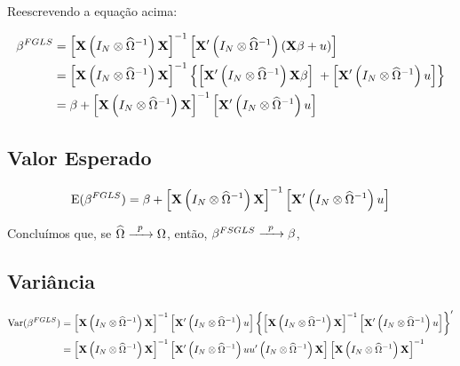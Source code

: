 \documentclass[11pt, oneside, a4paper, article]{article}
\numberwithin{equation}{section}
\begin{document}
Reescrevendo a equação acima:

\vspace{-1.5 em}
\begin{align*}
\beta^{FGLS}
&= 
\left[  \mathbf{X} \left( I_{N} \otimes \widehat{\Omega}^{-1} \right) \mathbf{X} \right]^{-1}
\left[  \mathbf{X}' \left( I_{N} \otimes \widehat{\Omega}^{-1} \right) (\mathbf{X} \beta + u) \right]
\\
&= 
\left[ \mathbf{X} \left( I_{N} \otimes \widehat{\Omega}^{-1} \right) \mathbf{X} \right]^{-1}
\left\{ 
\left[ \mathbf{X}' \left( I_{N} \otimes \widehat{\Omega}^{-1} \right) \mathbf{X} \beta \right]
\; +
\left[ \mathbf{X}' \left( I_{N} \otimes \widehat{\Omega}^{-1} \right) u \right]
\right\}
\\
&= 
\beta +
\left[ \mathbf{X} \left( I_{N} \otimes \widehat{\Omega}^{-1} \right) \mathbf{X} \right]^{-1}
\left[ \mathbf{X}' \left( I_{N} \otimes \widehat{\Omega}^{-1} \right) u \right]
\end{align*}

\subsection*{Valor Esperado}

\vspace{-1 em}
\begin{align*}
\text{E}(\beta^{FGLS})
= 
\beta +
\left[ \mathbf{X} \left( I_{N} \otimes \widehat{\Omega}^{-1} \right) \mathbf{X} \right]^{-1}
\left[ \mathbf{X}' \left( I_{N} \otimes \widehat{\Omega}^{-1} \right) u \right]
\end{align*}

Concluímos que, se 
$\widehat{\Omega} \xrightarrow{\enskip p \enskip} \Omega$,
então,
$\beta^{FSGLS} \xrightarrow{\enskip p \enskip} \beta$,

\subsection*{Variância}

\vspace{-1 em}
\begin{align*}
\text{Var}(\beta^{FGLS})
&= 
\left[ \mathbf{X} \left( I_{N} \otimes \widehat{\Omega}^{-1} \right) \mathbf{X} \right]^{-1}
\left[ \mathbf{X}' \left( I_{N} \otimes \widehat{\Omega}^{-1} \right) u \right]
\left\{ 
\left[ \mathbf{X} \left( I_{N} \otimes \widehat{\Omega}^{-1} \right) \mathbf{X} \right]^{-1}
\left[ \mathbf{X}' \left( I_{N} \otimes \widehat{\Omega}^{-1} \right) u \right]
\right\}^{\prime}
\\
&=
\left[ \mathbf{X} \left( I_{N} \otimes \widehat{\Omega}^{-1} \right) \mathbf{X} \right]^{-1}
\left[
\mathbf{X}' \left( I_{N} \otimes \widehat{\Omega}^{-1} \right) 
u u'
\left( I_{N} \otimes \widehat{\Omega}^{-1} \right) \mathbf{X}
\right]
\left[ \mathbf{X} \left( I_{N} \otimes \widehat{\Omega}^{-1} \right) \mathbf{X} \right]^{-1}
\end{align*}
\end{document}
